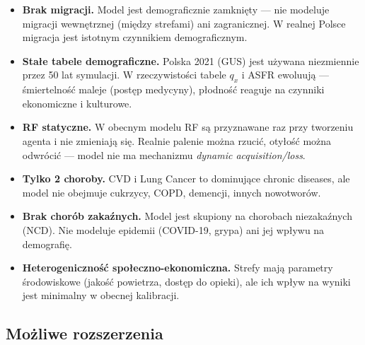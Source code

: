 \documentclass[11pt,a4paper]{article}
\begin{document}
\begin{itemize}[leftmargin=*]
  \item \textbf{Brak migracji.} Model jest demograficznie zamknięty --- nie modeluje migracji wewnętrznej (między strefami) ani zagranicznej. W realnej Polsce migracja jest istotnym czynnikiem demograficznym.

  \item \textbf{Stałe tabele demograficzne.} Polska 2021 (GUS) jest używana niezmiennie przez 50 lat symulacji. W rzeczywistości tabele $q_x$ i ASFR ewoluują --- śmiertelność maleje (postęp medycyny), płodność reaguje na czynniki ekonomiczne i kulturowe.

  \item \textbf{RF statyczne.} W obecnym modelu RF są przyznawane raz przy tworzeniu agenta i nie zmieniają się. Realnie palenie można rzucić, otyłość można odwrócić --- model nie ma mechanizmu \emph{dynamic acquisition/loss}.

  \item \textbf{Tylko 2 choroby.} CVD i Lung Cancer to dominujące chronic diseases, ale model nie obejmuje cukrzycy, COPD, demencji, innych nowotworów.

  \item \textbf{Brak chorób zakaźnych.} Model jest skupiony na chorobach niezakaźnych (NCD). Nie modeluje epidemii (COVID-19, grypa) ani jej wpływu na demografię.

  \item \textbf{Heterogeniczność społeczno-ekonomiczna.} Strefy mają parametry środowiskowe (jakość powietrza, dostęp do opieki), ale ich wpływ na wyniki jest minimalny w obecnej kalibracji.
\end{itemize}

\subsection{Możliwe rozszerzenia}
\end{document}
